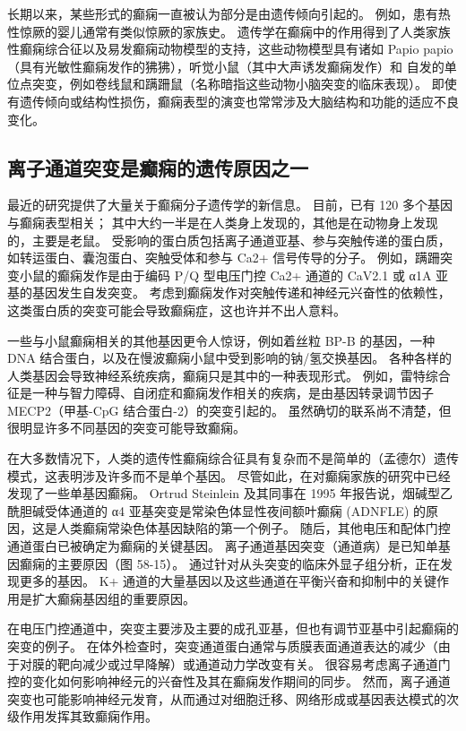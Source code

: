长期以来，某些形式的癫痫一直被认为部分是由遗传倾向引起的。
例如，患有热性惊厥的婴儿通常有类似惊厥的家族史。
遗传学在癫痫中的作用得到了人类家族性癫痫综合征以及易发癫痫动物模型的支持，这些动物模型具有诸如 Papio papio（具有光敏性癫痫发作的狒狒），听觉小鼠（其中大声诱发癫痫发作）和 自发的单位点突变，例如卷线鼠和蹒跚鼠（名称暗指这些动物小脑突变的临床表现）。
即使有遗传倾向或结构性损伤，癫痫表型的演变也常常涉及大脑结构和功能的适应不良变化。



\subsection{离子通道突变是癫痫的遗传原因之一}

最近的研究提供了大量关于癫痫分子遗传学的新信息。 目前，已有 120 多个基因与癫痫表型相关；
其中大约一半是在人类身上发现的，其他是在动物身上发现的，主要是老鼠。
受影响的蛋白质包括离子通道亚基、参与突触传递的蛋白质，如转运蛋白、囊泡蛋白、突触受体和参与 Ca2+ 信号传导的分子。
例如，蹒跚突变小鼠的癫痫发作是由于编码 P/Q 型电压门控 Ca2+ 通道的 CaV2.1 或 α1A 亚基的基因发生自发突变。
考虑到癫痫发作对突触传递和神经元兴奋性的依赖性，这类蛋白质的突变可能会导致癫痫症，这也许并不出人意料。


一些与小鼠癫痫相关的其他基因更令人惊讶，例如着丝粒 BP-B 的基因，一种 DNA 结合蛋白，以及在慢波癫痫小鼠中受到影响的钠/氢交换基因。
各种各样的人类基因会导致神经系统疾病，癫痫只是其中的一种表现形式。
例如，雷特综合征是一种与智力障碍、自闭症和癫痫发作相关的疾病，是由基因转录调节因子 MECP2（甲基-CpG 结合蛋白-2）的突变引起的。
虽然确切的联系尚不清楚，但很明显许多不同基因的突变可能导致癫痫。


在大多数情况下，人类的遗传性癫痫综合征具有复杂而不是简单的（孟德尔）遗传模式，这表明涉及许多而不是单个基因。
尽管如此，在对癫痫家族的研究中已经发现了一些单基因癫痫。
Ortrud Steinlein 及其同事在 1995 年报告说，烟碱型乙酰胆碱受体通道的 α4 亚基突变是常染色体显性夜间额叶癫痫 (ADNFLE) 的原因，这是人类癫痫常染色体基因缺陷的第一个例子。
随后，其他电压和配体门控通道蛋白已被确定为癫痫的关键基因。
离子通道基因突变（通道病）是已知单基因癫痫的主要原因（图 58-15）。
通过针对从头突变的临床外显子组分析，正在发现更多的基因。
K+ 通道的大量基因以及这些通道在平衡兴奋和抑制中的关键作用是扩大癫痫基因组的重要原因。


在电压门控通道中，突变主要涉及主要的成孔亚基，但也有调节亚基中引起癫痫的突变的例子。
在体外检查时，突变通道蛋白通常与质膜表面通道表达的减少（由于对膜的靶向减少或过早降解）或通道动力学改变有关。
很容易考虑离子通道门控的变化如何影响神经元的兴奋性及其在癫痫发作期间的同步。
然而，离子通道突变也可能影响神经元发育，从而通过对细胞迁移、网络形成或基因表达模式的次级作用发挥其致癫痫作用。


